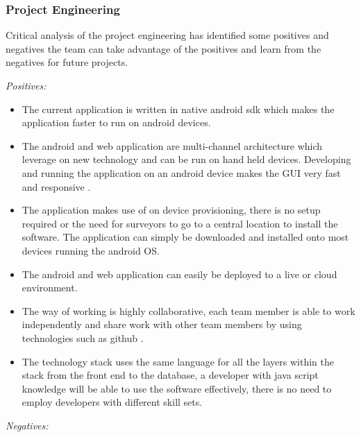 \documentclass[12pt]{witseiepaper}
\begin{document}




\subsubsection{Project Engineering}

Critical analysis of the project engineering has identified some positives and negatives the team can take advantage of the positives and learn from the negatives for future projects. 

\textit{Positives:}

\begin{itemize}
\item The current application is written in native android sdk which makes the application faster to run on android devices. 
\item The android and web application are multi-channel architecture which leverage on new technology and can be run on hand held devices. Developing and running the application on an android device makes the GUI very fast and responsive \cite{AndroidNative}.
\item The application makes use of on device provisioning, there is no setup required or the need for surveyors to go to a central location to install the software. The application can simply be downloaded and installed onto most devices running the android OS. 
\item The android and web application can easily be deployed to a live or cloud environment. 
\item The way of working is highly collaborative, each team member is able to work independently and share work with other team members by using technologies such as github \cite{GitHub}. 
\item The technology stack uses the same language for all the layers within the stack from the front end to the database, a developer with java script knowledge will be able to use the software effectively, there is no need to employ developers with different skill sets. 
\end{itemize}

\textit{Negatives:}
\end{document}
